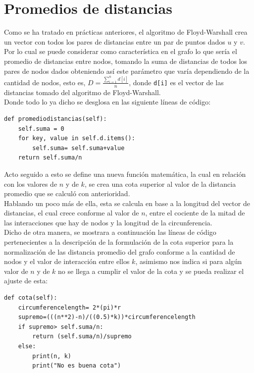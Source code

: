 \documentclass[12pt]{article}
\begin{document}
\section{Promedios de distancias}
Como se ha tratado en prácticas anteriores, el algoritmo de Floyd-Warshall\cite{libroalgo} crea un vector con todos los pares de distancias entre un par de puntos dados $u$ y $v$.\\
Por lo cual se puede considerar como característica en el grafo lo que sería el promedio de distancias entre nodos, tomando la suma de distancias de todos los pares de nodos dados obteniendo así este parámetro que varía dependiendo de la cantidad de nodos, esto es, $D= \frac{\sum_{i=1}^n d[i]}{n}$, donde \texttt{d[i]} es el vector de las distancias tomado del algoritmo de Floyd-Warshall.\\ Donde todo lo ya dicho se desglosa en las siguiente líneas de código:
\begin{lstlisting}[style=tt]
def promediodistancias(self):
	self.suma = 0
	for key, value in self.d.items():
		self.suma= self.suma+value
	return self.suma/n
\end{lstlisting}
Acto seguido a esto se define una nueva función matemática, la cual en relación con los valores de $n$ y de $k$, se crea una cota superior al valor de la distancia promedio que se calculó con anterioridad.\\
Hablando un poco más de ella, esta se calcula en base a la longitud del vector de distancias, el cual crece conforme al valor de $n$, entre el cociente de la mitad de las interacciones que hay de nodos y la longitud de la circunferencia.\\Dicho de otra manera, se mostrara a continuación las líneas de código pertenecientes a la descripción de la formulación de la cota superior para la normalización de las distancia promedio del grafo conforme a la cantidad de nodos y el valor de interacción entre ellos $k$, asimismo nos indica si para algún valor de $n$ y de $k$ no se llega a cumplir el valor de la cota y se pueda realizar el ajuste de esta:
\begin{lstlisting}[style=tt]
def cota(self):
	circumferencelength= 2*(pi)*r
	supremo=(((n**2)-n)/((0.5)*k))*circumferencelength
	if supremo> self.suma/n:
		return (self.suma/n)/supremo
	else:
		print(n, k)
		print("No es buena cota")
\end{lstlisting}
\end{document}
